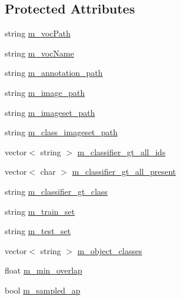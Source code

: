 \subsection*{Protected Attributes}
\begin{DoxyCompactItemize}
\item 
string \hyperlink{classVocData_ab5991ec812cb9c53716188ea67f52e51}{m\-\_\-voc\-Path}
\item 
string \hyperlink{classVocData_a292154bce82b205ce3946d7c66be9dff}{m\-\_\-voc\-Name}
\item 
string \hyperlink{classVocData_a4cea52c78090ef0d0c7ac380221802ab}{m\-\_\-annotation\-\_\-path}
\item 
string \hyperlink{classVocData_abab33911d384984e37e91b8ae1217f05}{m\-\_\-image\-\_\-path}
\item 
string \hyperlink{classVocData_af2aae5c6b4b430d3bf098f9557daea6a}{m\-\_\-imageset\-\_\-path}
\item 
string \hyperlink{classVocData_a456472463a937a9da9fd723b5aae65b8}{m\-\_\-class\-\_\-imageset\-\_\-path}
\item 
vector$<$ string $>$ \hyperlink{classVocData_aafde0db81fa35c5d46c4ce06b460b78e}{m\-\_\-classifier\-\_\-gt\-\_\-all\-\_\-ids}
\item 
vector$<$ char $>$ \hyperlink{classVocData_a02141120f0e5086a4f53113409b6d159}{m\-\_\-classifier\-\_\-gt\-\_\-all\-\_\-present}
\item 
string \hyperlink{classVocData_a35fe10bbcca7681acc0365cb18ca3920}{m\-\_\-classifier\-\_\-gt\-\_\-class}
\item 
string \hyperlink{classVocData_a6e63a9455ea3a21e08a493c5c2f26b5a}{m\-\_\-train\-\_\-set}
\item 
string \hyperlink{classVocData_ace1c925120f1b37c1fe536350aa42346}{m\-\_\-test\-\_\-set}
\item 
vector$<$ string $>$ \hyperlink{classVocData_a3b6160c9706be61b4abe53a2d672ca76}{m\-\_\-object\-\_\-classes}
\item 
float \hyperlink{classVocData_a8f6be5bd01a56f1fdf3ff6a1756e1ff6}{m\-\_\-min\-\_\-overlap}
\item 
bool \hyperlink{classVocData_a90dc858323c9074eef60dd14aebb611e}{m\-\_\-sampled\-\_\-ap}
\end{DoxyCompactItemize}


